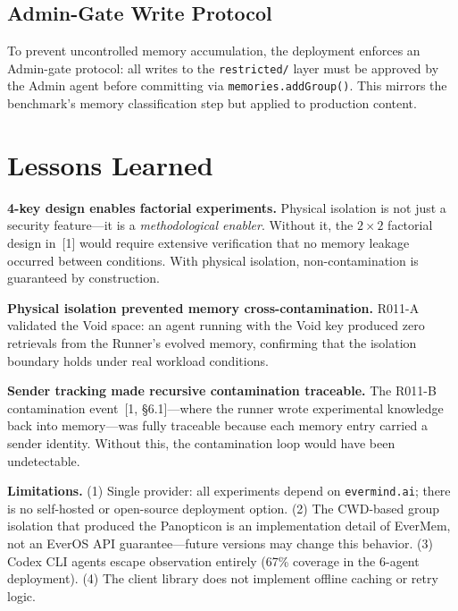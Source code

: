 \documentclass[11pt, a4paper]{article}
\begin{document}
\subsection{Admin-Gate Write Protocol}

To prevent uncontrolled memory accumulation, the deployment enforces an Admin-gate protocol: all writes to the \texttt{restricted/} layer must be approved by the Admin agent before committing via \texttt{memories.addGroup()}. This mirrors the benchmark's memory classification step but applied to production content.

\section{Lessons Learned}

\textbf{4-key design enables factorial experiments.} Physical isolation is not just a security feature---it is a \emph{methodological enabler}. Without it, the $2 \times 2$ factorial design in~[1] would require extensive verification that no memory leakage occurred between conditions. With physical isolation, non-contamination is guaranteed by construction.

\textbf{Physical isolation prevented memory cross-contamination.} R011-A validated the Void space: an agent running with the Void key produced zero retrievals from the Runner's evolved memory, confirming that the isolation boundary holds under real workload conditions.

\textbf{Sender tracking made recursive contamination traceable.} The R011-B contamination event~[1, \S6.1]---where the runner wrote experimental knowledge back into memory---was fully traceable because each memory entry carried a sender identity. Without this, the contamination loop would have been undetectable.

\textbf{Limitations.} (1) Single provider: all experiments depend on \texttt{evermind.ai}; there is no self-hosted or open-source deployment option. (2) The CWD-based group isolation that produced the Panopticon is an implementation detail of EverMem, not an EverOS API guarantee---future versions may change this behavior. (3) Codex CLI agents escape observation entirely (67\% coverage in the 6-agent deployment). (4) The client library does not implement offline caching or retry logic.

\clearpage
\end{document}
